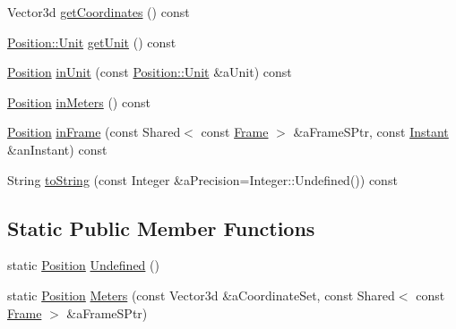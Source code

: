 \begin{DoxyCompactItemize}
\item 
Vector3d \hyperlink{classostk_1_1physics_1_1coord_1_1_position_ad316c42a469eb41062d15338d3ee7262}{get\+Coordinates} () const
\item 
\hyperlink{classostk_1_1physics_1_1units_1_1_length_a2664470a7eedf5d45c88861fe69badea}{Position\+::\+Unit} \hyperlink{classostk_1_1physics_1_1coord_1_1_position_aa62c2a532593e1e0e7f6ae180b2190f1}{get\+Unit} () const
\item 
\hyperlink{classostk_1_1physics_1_1coord_1_1_position}{Position} \hyperlink{classostk_1_1physics_1_1coord_1_1_position_a91baafa3dbbd48de681204c1c437ea35}{in\+Unit} (const \hyperlink{classostk_1_1physics_1_1units_1_1_length_a2664470a7eedf5d45c88861fe69badea}{Position\+::\+Unit} \&a\+Unit) const
\item 
\hyperlink{classostk_1_1physics_1_1coord_1_1_position}{Position} \hyperlink{classostk_1_1physics_1_1coord_1_1_position_a4df0c4df2717f7f6613e18a0d8e177e4}{in\+Meters} () const
\item 
\hyperlink{classostk_1_1physics_1_1coord_1_1_position}{Position} \hyperlink{classostk_1_1physics_1_1coord_1_1_position_a01c22174b6c2d27ccb363f35e307c5e9}{in\+Frame} (const Shared$<$ const \hyperlink{classostk_1_1physics_1_1coord_1_1_frame}{Frame} $>$ \&a\+Frame\+S\+Ptr, const \hyperlink{classostk_1_1physics_1_1time_1_1_instant}{Instant} \&an\+Instant) const
\item 
String \hyperlink{classostk_1_1physics_1_1coord_1_1_position_a6aa81e5bdaa16f35b1884ff8bc1238dc}{to\+String} (const Integer \&a\+Precision=Integer\+::\+Undefined()) const
\end{DoxyCompactItemize}
\subsection*{Static Public Member Functions}
\begin{DoxyCompactItemize}
\item 
static \hyperlink{classostk_1_1physics_1_1coord_1_1_position}{Position} \hyperlink{classostk_1_1physics_1_1coord_1_1_position_a9d9c2e5b2a72f978192eb9e3a7ce7d8b}{Undefined} ()
\item 
static \hyperlink{classostk_1_1physics_1_1coord_1_1_position}{Position} \hyperlink{classostk_1_1physics_1_1coord_1_1_position_abb788f397f0db9c86f7af8213ca2b063}{Meters} (const Vector3d \&a\+Coordinate\+Set, const Shared$<$ const \hyperlink{classostk_1_1physics_1_1coord_1_1_frame}{Frame} $>$ \&a\+Frame\+S\+Ptr)
\end{DoxyCompactItemize}
